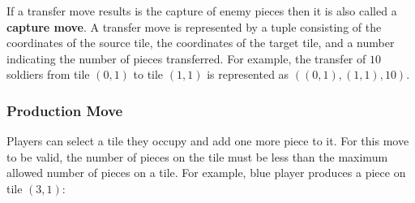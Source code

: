 \documentclass[letterpaper, 12pt]{article}
\begin{document}
If a transfer move results is the capture of enemy pieces then it is also called a
\textbf{capture move}. A transfer move is represented by a tuple consisting of the
coordinates of the source tile, the coordinates of the target tile, and a number
indicating the number of pieces transferred. For example, the transfer of \(10\)
soldiers from tile \((0,1)\) to tile \((1,1)\) is represented as \(((0,1), (1,1), 10)\).

\subsubsection{Production Move}
Players can select a tile they occupy and add one more piece to it. For this move to be
valid, the number of pieces on the tile must be less than the maximum allowed number of
pieces on a tile. For example, blue player produces a piece on tile \((3, 1)\):
\end{document}
